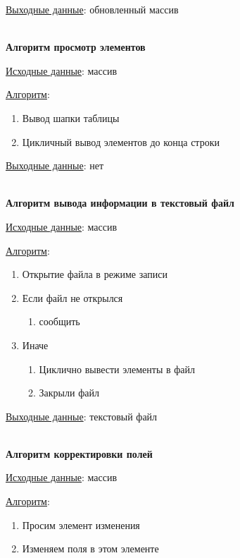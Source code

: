 \underline{Выходные данные}: обновленный массив

\hspace{0pt}\\



\textbf{Алгоритм просмотр элементов}

\underline{Исходные данные}: массив

\underline{Алгоритм}:

\begin{enumerate}
    \item Вывод шапки таблицы
    \item Цикличный вывод элементов до конца строки
\end{enumerate}

\underline{Выходные данные}: нет

\hspace{0pt}\\



\textbf{Алгоритм вывода информации в текстовый файл}

\underline{Исходные данные}: массив

\underline{Алгоритм}:

\begin{enumerate}
    \item Открытие файла в режиме записи
    \item Если файл не открылся
    \begin{enumerate}
        \item сообщить
    \end{enumerate}
    \item Иначе
    \begin{enumerate}
        \item Циклично вывести элементы в файл
        \item Закрыли файл
    \end{enumerate}
\end{enumerate}

\underline{Выходные данные}: текстовый файл

\hspace{0pt}\\



\textbf{Алгоритм корректировки полей}

\underline{Исходные данные}: массив

\underline{Алгоритм}:

\begin{enumerate}
    \item Просим элемент изменения
    \item Изменяем поля в этом элементе
\end{enumerate}

